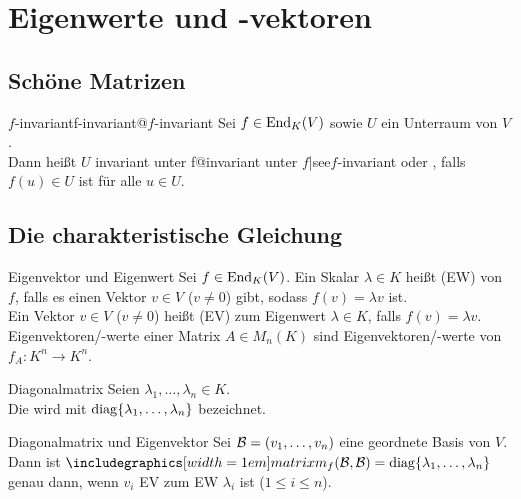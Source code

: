 \chapter{%
    Eigenwerte und -vektoren%
}

\section{%
    Schöne Matrizen%
}

\begin{xDef}{$f$-invariant}{f-invariant@$f$-invariant}
    Sei $f \in \operatorname{End}_K(V)$ sowie $U$ ein Unterraum von $V$. \\
    Dann heißt $U$
    {invariant unter f@invariant unter $f$|see{$f$-invariant}} oder
    ,
    falls $f(u) \in U$ ist für alle $u \in U$.
\end{xDef}

\section{%
    Die charakteristische Gleichung%
}

\begin{Def}{Eigenvektor und Eigenwert}
    Sei $f \in \operatorname{End}_K(V)$.
    Ein Skalar $\lambda \in K$ heißt  (EW) von $f$, falls
    es einen Vektor $v \in V$ ($v \not= 0$) gibt, sodass $f(v) = \lambda v$
    ist. \\
    Ein Vektor $v \in V$ ($v \not= 0$) heißt  (EV) zum
    Eigenwert $\lambda \in K$, falls $f(v) = \lambda v$. \\
    Eigenvektoren/-werte einer Matrix $A \in M_n(K)$ sind Eigenvektoren/-werte
    von $f_A: K^n \rightarrow K^n$.
\end{Def}

\begin{Def}{Diagonalmatrix}
    Seien $\lambda_1, \ldots, \lambda_n \in K$. \\
    Die 
    wird mit $\operatorname{diag}\{\lambda_1, \ldots, \lambda_n\}$ bezeichnet.
\end{Def}

\begin{Lemma}{Diagonalmatrix und Eigenvektor}
    Sei $\mathcal{B} = (v_1, \ldots, v_n)$ eine geordnete Basis von $V$.
    Dann ist $\hommatrix{f}{B}{B} = \diag\{\lambda_1, \ldots, \lambda_n\}$
    genau dann, wenn $v_i$ EV zum EW $\lambda_i$ ist ($1 \le i \le n$).
\end{Lemma}

